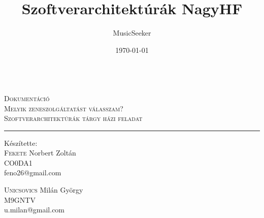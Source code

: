 \documentclass[a4paper,12pt]{article}
\author{MusicSeeker}
\title{Szoftverarchitektúrák NagyHF}
\date{\today}
\begin{document}
\begin{titlepage}
\begin{center}
\vspace*{\fill}
\hrulefill\\[0.5cm]
  \textsc{\LARGE Dokumentáció}\\[0.5cm] 
  \textsc{\Large Melyik zeneszolgáltatást válasszam? }\\[0.2cm]
  \textsc{\large Szoftverarchitektúrák tárgy házi feladat}\\[0.5cm]
\hrule
 \end{center}
 \vspace{3cm}
\begin{minipage}{0.6\textwidth}
\begin{flushleft} \large
Készítette:\\[0.2cm]
\textsc{Fekete} Norbert Zoltán\\[0.2cm]
CO0DA1\\
feno26@gmail.com
\end{flushleft}
\end{minipage}
\begin{minipage}{0.6\textwidth}
\begin{flushleft} \large
\vspace{0.82cm}
\textsc{Unicsovics} Milán György\\[0.2cm]
M9GNTV\\
u.milan@gmail.com
\end{flushleft}
\end{minipage}
\vspace*{\fill}
\end{titlepage}

\tableofcontents
\newpage



\end{document}
